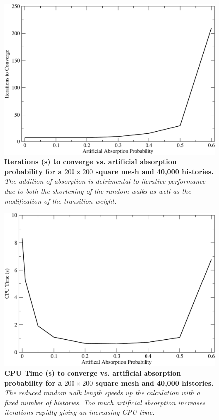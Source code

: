 \begin{figure}[p!]
  \centering
  \includegraphics[width=6in,clip]{chapters/mc_background/absorption_iters.pdf}
  \caption{\textbf{Iterations (s) to converge vs. artificial
      absorption probability for a $200 \times 200$ square mesh and
      40,000 histories.}  \textit{The addition of absorption is
      detrimental to iterative performance due to both the shortening
      of the random walks as well as the modification of the
      transition weight.}}
  \label{fig:absorption_iters}
\end{figure}

\begin{figure}[p!]
  \centering
  \includegraphics[width=6in,clip]{chapters/mc_background/absorption_time.pdf}
  \caption{\textbf{CPU Time (s) to converge vs. artificial absorption
      probability for a $200 \times 200$ square mesh and 40,000
      histories.}  \textit{The reduced random walk length speeds up
      the calculation with a fixed number of histories. Too much
      artificial absorption increases iterations rapidly giving an
      increasing CPU time.}}
  \label{fig:absorption_time}
\end{figure}
\clearpage

